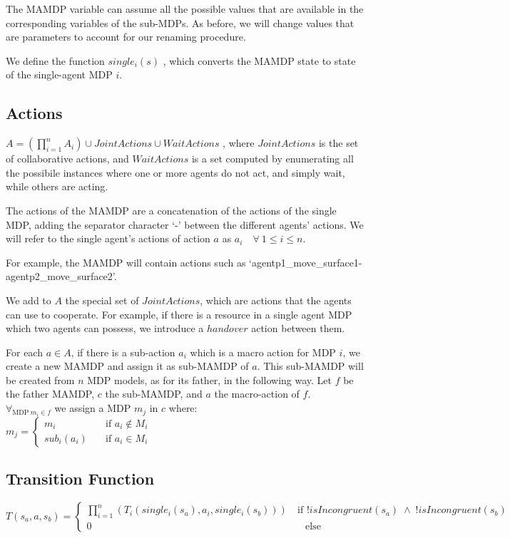 The MAMDP variable can assume all the possible values that are available in the corresponding variables of the sub-MDPs. As before, we will change values that are parameters to account for our renaming procedure. 

We define the function $single_i(s)$ , which converts the MAMDP state to state of the single-agent MDP $i$.


\subsection{Actions}
$A=(\prod_{i=1}^{n} A_i) \cup JointActions \cup WaitActions$ , where $JointActions$ is the set of collaborative actions, and $WaitActions$ is a set computed by enumerating all the possibile instances where one or more agents do not act, and simply wait, while others are acting.

The actions of the MAMDP are a concatenation of the actions of the single MDP, adding the separator character `-' between the different agents' actions. We will refer to the single agent's actions of action $a$ as $a_i \quad \forall \> 1\leq i \leq n$.

For example, the MAMDP will contain actions such as `agentp1\_move\_surface1-agentp2\_move\_surface2'.

We add to $A$ the special set of $JointActions$, which are actions that the agents can use to cooperate. For example, if there is a resource in a single agent MDP which two agents can possess, we introduce a $handover$ action between them. 

For each $a \in A$, if there is a sub-action $a_i$ which is a macro action for MDP $i$, we create a new MAMDP and assign it as sub-MAMDP of $a$. This sub-MAMDP will be created from $n$ MDP models, as for its father, in the following way. Let $f$ be the father MAMDP, $c$ the sub-MAMDP, and $a$ the macro-action of $f$. \\
 $ \forall_{\text{MDP}\> m_i \in f}$ we assign a MDP $m_j$ in $c$ where:\\
$m_j= \begin{cases}
	m_i & \quad \text{if } a_i \not\in M_i \\
	sub_i(a_i) & \quad \text{if } a_i \in M_i 
\end{cases}$ \\

\subsection{Transition Function}
\label{subsec:mamdp-transition}
$T(s_a,a,s_b)=
\begin{cases}
\prod_{i=1}^{n}(T_i(single_i(s_a),a_i,single_i(s_b))) & \> \text{if } !isIncongruent(s_a)\; \land  \;!isIncongruent(s_b)  \\
0   & \quad \text{else}
	\end{cases}$ \\

